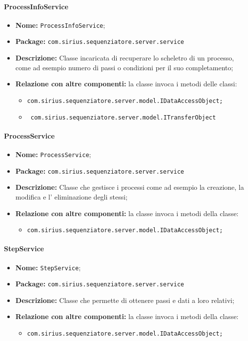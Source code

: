 \paragraph{ProcessInfoService}
	\begin{itemize}
		\item \textbf{Nome:} \texttt{ProcessInfoService};
		\item \textbf{Package:} \texttt{com.sirius.sequenziatore.server.service}
		\item \textbf{Descrizione:} Classe incaricata di recuperare lo scheletro di un processo, come ad esempio numero di passi o condizioni per il suo completamento;
		\item \textbf{Relazione con altre componenti:} la classe invoca i metodi delle classi:
		\begin{itemize}
			\item \texttt{com.sirius.sequenziatore.server.model.IDataAccessObject;}
			\item \texttt{ com.sirius.sequenziatore.server.model.ITransferObject}
		\end{itemize}
	\end{itemize}
\paragraph{ProcessService}
	\begin{itemize}
		\item \textbf{Nome:} \texttt{ProcessService};
		\item \textbf{Package:} \texttt{com.sirius.sequenziatore.server.service}
		\item \textbf{Descrizione:} Classe che gestisce i processi come ad esempio la creazione, la modifica e l' eliminazione degli stessi;
		\item \textbf{Relazione con altre componenti:} la classe invoca i metodi della classe:
		\begin{itemize}
			\item \texttt{com.sirius.sequenziatore.server.model.IDataAccessObject;}
		\end{itemize}
	\end{itemize}
\paragraph{StepService}
	\begin{itemize}
		\item \textbf{Nome:} \texttt{StepService};
		\item \textbf{Package:} \texttt{com.sirius.sequenziatore.server.service}
		\item \textbf{Descrizione:} Classe che permette di ottenere passi e dati a loro relativi;
		\item \textbf{Relazione con altre componenti:} la classe invoca i metodi della classe:
		\begin{itemize}
			\item \texttt{com.sirius.sequenziatore.server.model.IDataAccessObject;}
		\end{itemize}
	\end{itemize}
